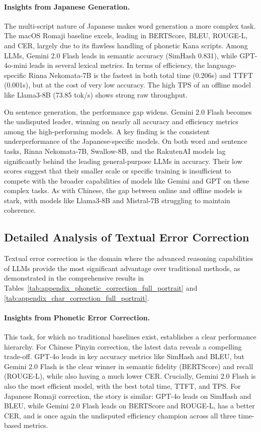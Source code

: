 \documentclass[10pt, a4paper]{article}
\begin{document}
\paragraph{Insights from Japanese Generation.}
The multi-script nature of Japanese makes word generation a more complex task. The {macOS Romaji} baseline excels, leading in BERTScore, BLEU, ROUGE-L, and CER, largely due to its flawless handling of phonetic Kana scripts. Among LLMs, {Gemini 2.0 Flash} leads in semantic accuracy (SimHash 0.831), while {GPT-4o-mini} leads in several lexical metrics. In terms of efficiency, the language-specific {Rinna Nekomata-7B} is the fastest in both total time (0.206s) and TTFT (0.001s), but at the cost of very low accuracy. The high TPS of an offline model like {Llama3-8B} (73.85 tok/s) shows strong raw throughput.

On sentence generation, the performance gap widens. Gemini 2.0 Flash becomes the undisputed leader, winning on nearly all accuracy and efficiency metrics among the high-performing models. A key finding is the consistent underperformance of the Japanese-specific models. On both word and sentence tasks, Rinna Nekomata-7B, Swallow-8B, and the RakutenAI models lag significantly behind the leading general-purpose LLMs in accuracy. Their low scores suggest that their smaller scale or specific training is insufficient to compete with the broader capabilities of models like Gemini and GPT on these complex tasks. As with Chinese, the gap between online and offline models is stark, with models like {Llama3-8B} and {Mistral-7B} struggling to maintain coherence.

\subsection{Detailed Analysis of Textual Error Correction}

Textual error correction is the domain where the advanced reasoning capabilities of LLMs provide the most significant advantage over traditional methods, as demonstrated in the comprehensive results in Tables~\ref{tab:appendix_phonetic_correction_full_portrait} and \ref{tab:appendix_char_correction_full_portrait}.

\paragraph{Insights from Phonetic Error Correction.}
This task, for which no traditional baselines exist, establishes a clear performance hierarchy. For {Chinese Pinyin correction}, the latest data reveals a compelling trade-off. {GPT-4o} leads in key accuracy metrics like SimHash and BLEU, but {Gemini 2.0 Flash} is the clear winner in semantic fidelity (BERTScore) and recall (ROUGE-L), while also having a much lower CER. Crucially, {Gemini 2.0 Flash} is also the most efficient model, with the best total time, TTFT, and TPS. For {Japanese Romaji correction}, the story is similar: {GPT-4o} leads on SimHash and BLEU, while {Gemini 2.0 Flash} leads on BERTScore and ROUGE-L, has a better CER, and is once again the undisputed efficiency champion across all three time-based metrics.
\end{document}
